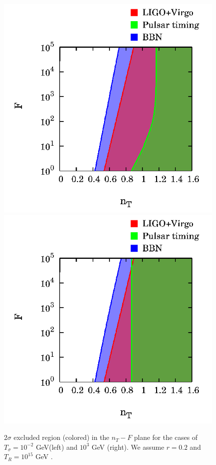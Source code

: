 \documentclass[11pt,a4paper,twoside]{book}
\begin{document}
\begin{figure}[h]
	\centering
	\includegraphics[width=0.45\linewidth, height=0.3\textheight]{Images/Chap3/Kurojanagi_Takahashi_Fig4A}
		\includegraphics[width=0.45\linewidth, height=0.3\textheight]{Images/Chap3/Kurojanagi_Takahashi_Fig4B}
	\caption{$ 2\sigma $ excluded region (colored) in the $ n_{T}-F $ plane for the cases of $ T_{\sigma}=10^{-2} $ GeV(left) and $ 10^{3} $ GeV (right). We assume $ r=0.2 $ and $ T_{R}=10^{15} $ GeV \cite{Chap3:BlueTiltedSpectrum}. }
	\label{fig:kurojanagitakahashifig4a}
\end{figure}
\end{document}
